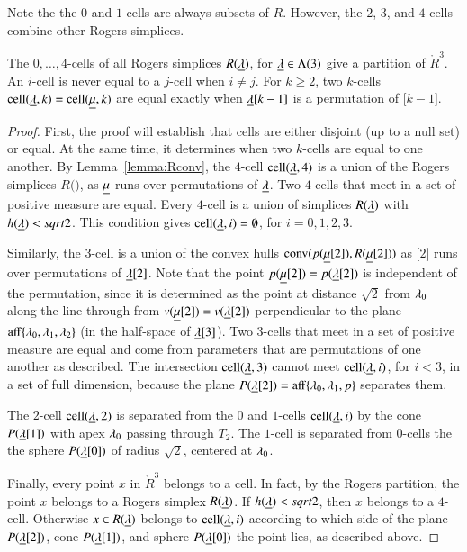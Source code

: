 Note the the $0$ and $1$-cells are always subsets of $R$.  However, the $2$, $3$, and
$4$-cells combine other Rogers simplices.

\begin{lemma}  The $0,\ldots,4$-cells of all Rogers simplices $R({\underline{\lambda}})$, for ${\underline{\lambda}}\in \Lambda(3)$
give a partition of $\ring{R}^3$.  An $i$-cell is never equal to a $j$-cell when $i\ne j$. For $k\ge 2$, 
two $k$-cells $\operatorname{cell}({\underline{\lambda}},k)=\operatorname{cell}({\underline{\mu}},k)$ are equal exactly when ${\underline{\lambda}}[k-1]$
is a permutation of $\bm[k-1]$.
\end{lemma}

\begin{proof}  First, the proof will establish that cells are either disjoint (up to a null set) or equal.  At the same time, it determines when two $k$-cells are equal to one another. By Lemma~\ref{lemma:Rconv}, the $4$-cell $\operatorname{cell}({\underline{\lambda}},4)$ is a union of the Rogers simplices $R(\bm)$, as ${\underline{\mu}}$ runs over permutations of ${\underline{\lambda}}$.   Two $4$-cells that meet in a set of positive measure are equal.  Every $4$-cell is a union of simplices $R({\underline{\lambda}})$ with $h({\underline{\lambda}})<sqrt2$.  This condition gives $\operatorname{cell}({\underline{\lambda}},i)=\emptyset$, for $i=0,1,2,3$.

Similarly, the $3$-cell is a union
of the convex hulls ${\operatorname{conv}}(p({\underline{\mu}}[2]),R({\underline{\mu}}[2]))$ as $\bm[2]$ runs over permutations of ${\underline{\lambda}}[2]$.  Note that the point $p({\underline{\mu}}[2])=p({\underline{\lambda}}[2])$ is independent of the permutation, since
it is determined as the point at distance $\sqrt2$ from $\lambda_0$ along the line through
from $v({\underline{\mu}}[2])=v({\underline{\lambda}}[2])$ perpendicular to the plane ${\operatorname{aff}}\{\lambda_0,\lambda_1,\lambda_2\}$
(in the half-space of ${\underline{\lambda}}[3]$). Two $3$-cells that meet in a set of positive measure are equal and come from parameters that are permutations of  one another as described.   The intersection $\operatorname{cell}({\underline{\lambda}},3)$ cannot meet $\operatorname{cell}({\underline{\lambda}},i)$, for $i<3$, in a set of full dimension, because the plane $P({\underline{\lambda}}[2])={\operatorname{aff}}\{\lambda_0,\lambda_1,p\}$ separates them.

The $2$-cell $\operatorname{cell}({\underline{\lambda}},2)$ is separated from the $0$ and $1$-cells $\operatorname{cell}({\underline{\lambda}},i)$
by the cone $P({\underline{\lambda}}[1])$ with apex $\lambda_0$
passing through $T_2$. The $1$-cell is separated from $0$-cells the the sphere $P({\underline{\lambda}}[0])$
of radius
$\sqrt2$, centered at $\lambda_0$.

Finally,  every point $x$ in $\ring{R}^3$ belongs to a cell.  In fact, by the Rogers
partition, the point $x$ belongs to a Rogers simplex $R({\underline{\lambda}})$.  If $h({\underline{\lambda}})<sqrt2$, then
$x$ belongs to a $4$-cell.  Otherwise $x\in R({\underline{\lambda}})$ belongs to $\operatorname{cell}({\underline{\lambda}},i)$ according to
which side of the plane $P({\underline{\lambda}}[2])$, cone $P({\underline{\lambda}}[1])$, and sphere $P({\underline{\lambda}}[0])$ the point
lies, as described above.
\end{proof}



